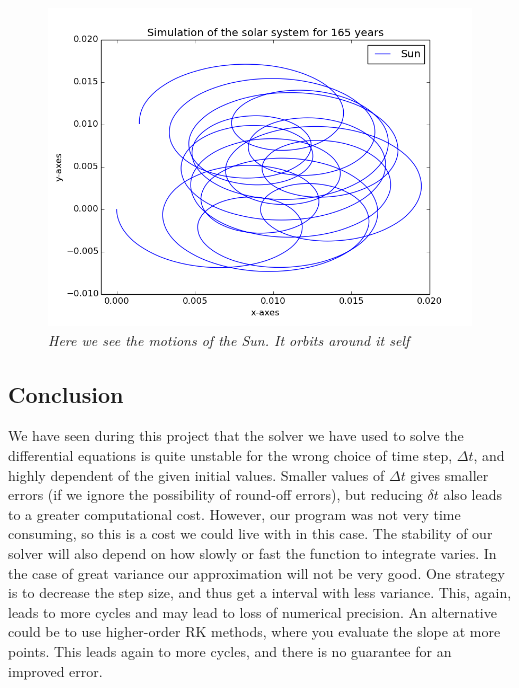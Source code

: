 \documentclass[a4paper,12pt, english]{article}
\begin{document}
\begin{figure}[h!]
  \centering
   	 \includegraphics[scale=0.5]{Solar_system_sun.png}
  \caption{\textit{Here we see the motions of the Sun. It orbits around it self}}
\end{figure}


\subsection{Conclusion}

We have seen during this project that the solver we have used to solve the differential equations is quite unstable for the wrong choice of time step, $\Delta t$, and highly dependent of the given initial values. Smaller values of $\Delta t$ gives smaller errors (if we ignore the possibility of round-off errors), but reducing $\delta t$ also leads to a greater computational cost. However, our program was not very time consuming, so this is a cost we could live with in this case. The stability of our solver will also depend on how slowly or fast the function to integrate varies. In the case of great variance our approximation will not be very good. One strategy is to decrease the step size, and thus get a interval with less variance. This, again, leads to more cycles and may lead to loss of numerical precision. An alternative could be to use higher-order RK methods, where you evaluate the slope at more points. This leads again to more cycles, and there is no guarantee for an improved error.  \\
\end{document}
